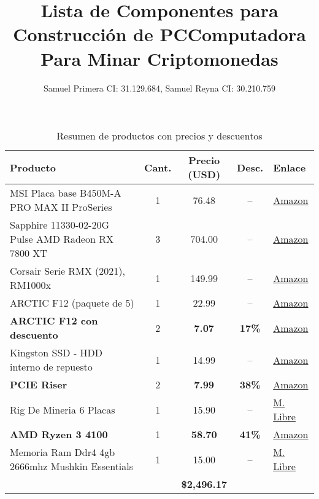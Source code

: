 \documentclass{article}
\title{\textbf{Lista de Componentes para Construcción de PC}}
\title{Computadora Para Minar Criptomonedas}
\author{Samuel Primera CI: 31.129.684, Samuel Reyna CI: 30.210.759}
\begin{document}
\maketitle

\begin{table}[h]
\centering
\caption{Resumen de productos con precios y descuentos}
\label{tab:productos}
\renewcommand{\arraystretch}{1.2}
\begin{tabular}{@{}>{\raggedright\arraybackslash}p{5cm}ccc>{\raggedright\arraybackslash}p{3.5cm}@{}}
\toprule
\rowcolor{lightblue}
\textbf{Producto} & \textbf{Cant.} & \textbf{Precio (USD)} & \textbf{Desc.} & \textbf{Enlace} \\
\midrule
MSI Placa base B450M-A PRO MAX II ProSeries & 1 & 76.48 & -- & \href{https://www.amazon.com/-/es/PRO-MAX-II-compatible-procesadores/dp/B0CLVGM4TB/ref=sr_1_1?sr=8-1}{Amazon} \\
Sapphire 11330-02-20G Pulse AMD Radeon RX 7800 XT & 3 & 704.00 & -- & \href{https://www.amazon.com/-/es/Sapphire-11330-02-20G-Radeon-Tarjeta-gr\%C3\%A1fica/dp/B0CFWM1LNH}{Amazon} \\
Corsair Serie RMX (2021), RM1000x & 1 & 149.99 & -- & \href{https://www.amazon.com/-/es/Corsair-RM1000x-alimentaci\%C3\%B3n-totalmente-renovada/dp/B09F1XRN4J/ref=pd_ci_mcx_pspc_dp_2_t_2}{Amazon} \\
ARCTIC F12 (paquete de 5) & 1 & 22.99 & -- & \href{https://www.amazon.com/dp/B09JG7DVM}{Amazon} \\
\textbf{ARCTIC F12 con descuento} & 2 & \textbf{7.07} & \textbf{17\%} & \href{https://www.amazon.com/dp/B09JG7DVMT}{Amazon} \\
Kingston SSD - HDD interno de repuesto & 1 & 14.99 & -- & \href{https://www.amazon.com/-/es/Kingston-SSD-repuesto-aumentar-rendimiento/dp/B07P22T3VD}{Amazon} \\
\textbf{PCIE Riser} & 2 & \textbf{7.99} & \textbf{38\%} & \href{https://www.amazon.com/-/es/MZHOU-PCIE-Riser-adaptadoras-extensi\%C3\%B3n/dp/B09F2VY1QH/ref=pd_ci_mcx_pspc_dp_2_t_1}{Amazon} \\
Rig De Mineria 6 Placas & 1 & 15.90 & -- & \href{https://www.mercadolibre.com.ar/rig-de-mineria-6-placas-componentes-cualquier-tamano/up/MLAU2885045905\#polycard_client=search-nordic}{M. Libre} \\
\textbf{AMD Ryzen 3 4100} & 1 & \textbf{58.70} & \textbf{41\%} & \href{https://www.amazon.com/-/es/AMD-Ryzen-4100-Procesador-desbloqueado/dp/B09VCRQVWM/ref=pd_ci_mcx_di_int_sccai_cn_d_sccl_2_5/146-0730353-2200262?psc=1}{Amazon} \\
Memoria Ram Ddr4 4gb 2666mhz Mushkin Essentials & 1 & 15.00 & -- & \href{https://articulo.mercadolibre.com.ve/MLV-705928030-memoria-ram-ddr4-4gb-2666mhz-mushkin-essentials-_JM\#polycard_client=search-nordic}{M. Libre} \\
\addlinespace
\multicolumn{3}{l}{\textbf{Total General}} & \multicolumn{2}{r}{\textbf{\$2,496.17}} \\
\bottomrule
\end{tabular}
\end{table}
\end{document}
